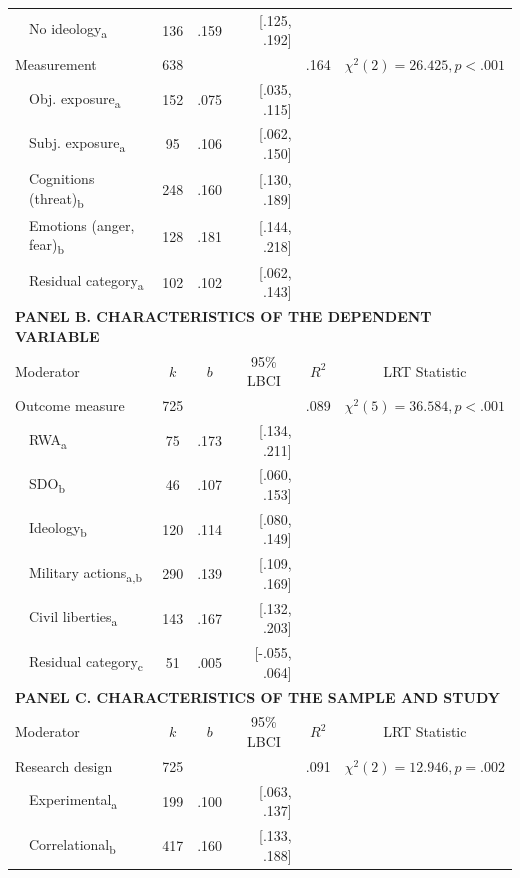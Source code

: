 \begin{ThreePartTable}
\begin{longtable}[c]{llcrrcc}
 & No ideology\textsubscript{a} & 136 & .159 & [.125, .192] &  &  \\
\multicolumn{2}{l}{Measurement} & 638 &  &  & .164 & $\chi^2(2)=26.425, p<.001$ \\
 & Obj. exposure\textsubscript{a} & 152 & .075 & [.035, .115] &  &  \\
 & Subj. exposure\textsubscript{a} & 95 & .106 & [.062, .150] &  &  \\
 & Cognitions (threat)\textsubscript{b} & 248 & .160 & [.130, .189] &  &  \\
 & Emotions (anger, fear)\textsubscript{b} & 128 & .181 & [.144, .218] &  &  \\
 & Residual category\textsubscript{a} & 102 & .102 & [.062, .143] &  & \\ [1.5ex] \hline
 \multicolumn{7}{l}{\textbf{PANEL B. CHARACTERISTICS OF THE DEPENDENT VARIABLE}} \\ \hline
 \multicolumn{2}{l}{{Moderator}} & \multicolumn{1}{c}{{$k$}} & \multicolumn{1}{c}{{$b$}} & \multicolumn{1}{c}{{95\% LBCI}} & \multicolumn{1}{c}{{$R^2$}} & \multicolumn{1}{c}{{LRT Statistic}} \\ \hline
\multicolumn{2}{l}{Outcome measure} & 725 &  &  & .089 & $\chi^2(5)=36.584, p<.001$ \\
 & RWA\textsubscript{a} & 75 & .173 & [.134, .211] &  &  \\
 & SDO\textsubscript{b} & 46 & .107 & [.060, .153] &  &  \\
 & Ideology\textsubscript{b} & 120 & .114 & [.080, .149] &  &  \\
 & Military actions\textsubscript{a,b} & 290 & .139 & [.109, .169] &  &  \\
 & Civil liberties\textsubscript{a} & 143 & .167 & [.132,  .203] &  &  \\
 & Residual category\textsubscript{c} & 51 & .005 & [-.055, .064] &  & \\ [1.5ex] \hline
 \multicolumn{7}{l}{\textbf{PANEL C. CHARACTERISTICS OF THE SAMPLE AND STUDY}} \\ \hline
 \multicolumn{2}{l}{{Moderator}} & \multicolumn{1}{c}{{$k$}} & \multicolumn{1}{c}{{$b$}} & \multicolumn{1}{c}{{95\% LBCI}} & \multicolumn{1}{c}{{$R^2$}} & \multicolumn{1}{c}{{LRT Statistic}} \\ \hline
\multicolumn{2}{l}{Research design} & 725 &  &  & .091 & $\chi^2(2)=12.946, p=.002$ \\
 & Experimental\textsubscript{a} & 199 & .100 & [.063, .137] &  &  \\
 & Correlational\textsubscript{b} & 417 & .160 & [.133, .188] &  &  \\

\end{longtable}
\end{ThreePartTable}
